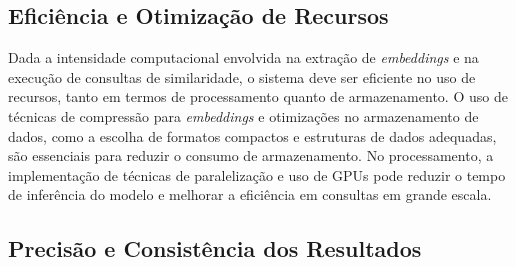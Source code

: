 





\subsection{Eficiência e Otimização de Recursos}
\label{sec:req-eficiencia}

Dada a intensidade computacional envolvida na extração de \emph{embeddings} e na execução de consultas de similaridade, o sistema deve ser eficiente no uso de recursos, tanto em termos de processamento quanto de armazenamento. O uso de técnicas de compressão para \emph{embeddings} e otimizações no armazenamento de dados, como a escolha de formatos compactos e estruturas de dados adequadas, são essenciais para reduzir o consumo de armazenamento. No processamento, a implementação de técnicas de paralelização e uso de GPUs pode reduzir o tempo de inferência do modelo e melhorar a eficiência em consultas em grande escala.



\subsection{Precisão e Consistência dos Resultados}
\label{sec:req-precisao}

